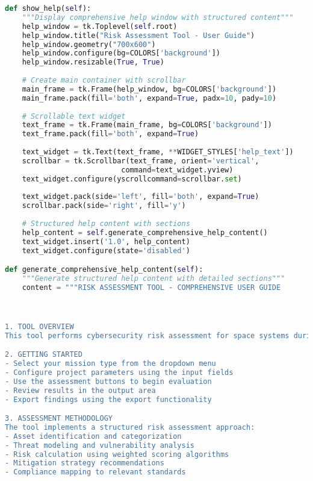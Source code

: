 \documentclass[binding=0.6cm]{sapthesis}
\begin{document}
\begin{lstlisting}[language=Python, caption=Enhanced Help System Implementation]
def show_help(self):
    """Display comprehensive help window with structured content"""
    help_window = tk.Toplevel(self.root)
    help_window.title("Risk Assessment Tool - User Guide")
    help_window.geometry("700x600")
    help_window.configure(bg=COLORS['background'])
    help_window.resizable(True, True)
    
    # Create main container with scrollbar
    main_frame = tk.Frame(help_window, bg=COLORS['background'])
    main_frame.pack(fill='both', expand=True, padx=10, pady=10)
    
    # Scrollable text widget
    text_frame = tk.Frame(main_frame, bg=COLORS['background'])
    text_frame.pack(fill='both', expand=True)
    
    text_widget = tk.Text(text_frame, **WIDGET_STYLES['help_text'])
    scrollbar = tk.Scrollbar(text_frame, orient='vertical', 
                           command=text_widget.yview)
    text_widget.configure(yscrollcommand=scrollbar.set)
    
    text_widget.pack(side='left', fill='both', expand=True)
    scrollbar.pack(side='right', fill='y')
    
    # Structured help content with sections
    help_content = self.generate_comprehensive_help_content()
    text_widget.insert('1.0', help_content)
    text_widget.configure(state='disabled')

def generate_comprehensive_help_content(self):
    """Generate structured help content with detailed sections"""
    content = """RISK ASSESSMENT TOOL - COMPREHENSIVE USER GUIDE



1. TOOL OVERVIEW
This tool performs cybersecurity risk assessment for space systems during various project phases. It evaluates threats, vulnerabilities, and associated risks to provide actionable security insights.

2. GETTING STARTED
- Select your mission type from the dropdown menu
- Configure project parameters using the input fields
- Use the assessment buttons to begin evaluation
- Review results in the output area
- Export findings using the export functionality

3. ASSESSMENT METHODOLOGY
The tool implements a structured risk assessment approach:
- Asset identification and categorization
- Threat modeling and vulnerability analysis
- Risk calculation using weighted scoring algorithms
- Mitigation strategy recommendations
- Compliance mapping to relevant standards


\end{lstlisting}
\end{document}
